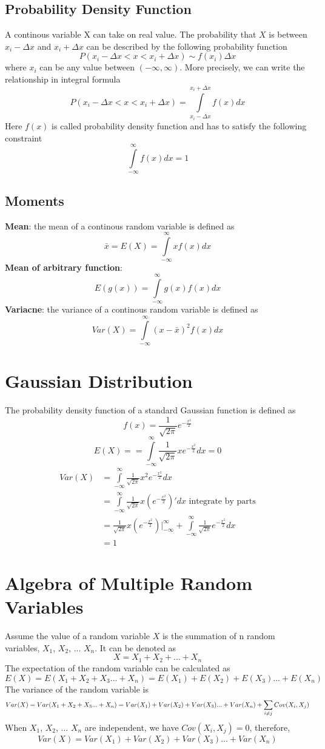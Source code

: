 \documentclass[12pt, oneside]{article}
\begin{document}
\subsection{Probability Density Function}
A continous variable X can take on real value. The probability that $X$ is between $x_i-\Delta x$ and $x_i+ \Delta x$ can be described by the following probability function
$$P(x_i-\Delta x<x<x_i+\Delta x)\sim f(x_i)\Delta x$$
where $x_i$ can be any value between $(-\infty, \infty)$. More precisely, we can write the relationship in integral formula
$$P(x_i-\Delta x<x<x_i+\Delta x)=\int\limits_{x_i-\Delta x}^{x_i+\Delta x}f(x)dx$$
Here $f(x)$ is called probability density function and has to satisfy the following constraint
$$\int\limits_{-\infty}^{\infty}f(x)dx=1$$
\subsection{Moments}
\textbf{Mean}: the mean of a continous random variable is defined as 
$$\bar{x}=E(X)=\int\limits_{-\infty}^{\infty}xf(x)dx$$
\textbf{Mean of arbitrary function}:
$$E(g(x))=\int\limits_{-\infty}^{\infty}g(x)f(x)dx$$
\textbf{Variacne}: the variance of a continous random variable is defined as 
$$Var(X)=\int\limits_{-\infty}^{\infty}(x-\bar{x})^2f(x)dx$$

\section{Gaussian Distribution}
The probability density function of a standard Gaussian function is defined as 
$$f(x)=\frac{1}{\sqrt{2\pi}}e^{-\frac{x^2}{2}}$$
$$E(X)==\int\limits_{-\infty}^{\infty}\frac{1}{\sqrt{2\pi}}xe^{-\frac{x^2}{2}}dx=0$$
\begin{align*}
Var(X)&=\int\limits_{-\infty}^{\infty}\frac{1}{\sqrt{2\pi}}x^2e^{-\frac{x^2}{2}}dx\\
&=\int\limits_{-\infty}^{\infty}\frac{1}{\sqrt{2\pi}}x(e^{-\frac{x^2}{2}})'dx \text{ integrate by parts}\\
&=\frac{1}{\sqrt{2\pi}}x(e^{-\frac{x^2}{2}})|_{-\infty}^{\infty}+\int\limits_{-\infty}^{\infty}\frac{1}{\sqrt{2\pi}}e^{-\frac{x^2}{2}}dx\\
&=1
\end{align*}

\section{Algebra of Multiple Random Variables}
Assume the value of a random variable $X$ is the summation of n random variables, $X_1$, $X_2$, ... $X_n$. It can be denoted as
$$X=X_1+X_2+ ... +X_n$$
The expectation of the random variable can be calculated as 
$$E(X)=E(X_1+X_2+X_3 ... +X_n)=E(X_1)+E(X_2)+E(X_3)...+E(X_n)$$
The variance of the random variable is 
$$Var(X)=Var(X_1+X_2+X_3 ... +X_n)=Var(X_1)+Var(X_2)+Var(X_3)...+Var(X_n)+\sum_{i\neq	j}\mathnormal{Cov}(X_i, X_j)$$
When $X_1$, $X_2$, ... $X_n$ are independent, we have $Cov(X_i, X_j)=0$, therefore,
$$Var(X)=Var(X_1)+Var(X_2)+Var(X_3)...+Var(X_n)$$
\end{document}
